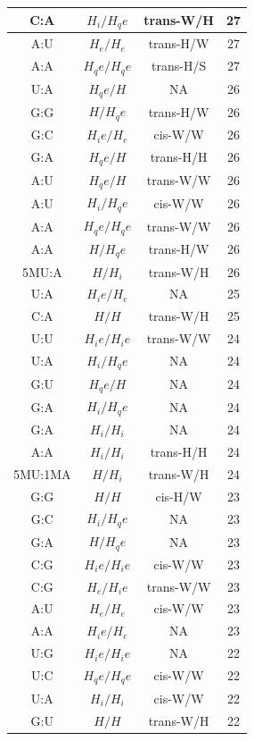 \begin{center}
\begin{longtable}{c|c|c|c}
C:A & $H_i/H_qe$ & trans-W/H & 27 \\  \hline
A:U & $H_e/H_e$ & trans-H/W & 27 \\  \hline
A:A & $H_qe/H_qe$ & trans-H/S & 27 \\  \hline
U:A & $H_qe/H$ & NA & 26 \\  \hline
G:G & $H/H_qe$ & trans-H/W & 26 \\  \hline
G:C & $H_ie/H_e$ & cis-W/W & 26 \\  \hline
G:A & $H_qe/H$ & trans-H/H & 26 \\  \hline
A:U & $H_qe/H$ & trans-W/W & 26 \\  \hline
A:U & $H_i/H_qe$ & cis-W/W & 26 \\  \hline
A:A & $H_qe/H_qe$ & trans-W/W & 26 \\  \hline
A:A & $H/H_qe$ & trans-H/W & 26 \\  \hline
5MU:A & $H/H_i$ & trans-W/H & 26 \\  \hline
U:A & $H_ie/H_e$ & NA & 25 \\  \hline
C:A & $H/H$ & trans-W/H & 25 \\  \hline
U:U & $H_ie/H_ie$ & trans-W/W & 24 \\  \hline
U:A & $H_i/H_qe$ & NA & 24 \\  \hline
G:U & $H_qe/H$ & NA & 24 \\  \hline
G:A & $H_i/H_qe$ & NA & 24 \\  \hline
G:A & $H_i/H_i$ & NA & 24 \\  \hline
A:A & $H_i/H_i$ & trans-H/H & 24 \\  \hline
5MU:1MA & $H/H_i$ & trans-W/H & 24 \\  \hline
G:G & $H/H$ & cis-H/W & 23 \\  \hline
G:C & $H_i/H_qe$ & NA & 23 \\  \hline
G:A & $H/H_qe$ & NA & 23 \\  \hline
C:G & $H_ie/H_ie$ & cis-W/W & 23 \\  \hline
C:G & $H_e/H_ie$ & trans-W/W & 23 \\  \hline
A:U & $H_e/H_e$ & cis-W/W & 23 \\  \hline
A:A & $H_ie/H_e$ & NA & 23 \\  \hline
U:G & $H_ie/H_ie$ & NA & 22 \\  \hline
U:C & $H_qe/H_qe$ & cis-W/W & 22 \\  \hline
U:A & $H_i/H_i$ & cis-W/W & 22 \\  \hline
G:U & $H/H$ & trans-W/H & 22 \\  \hline

\end{longtable}
\end{center}
